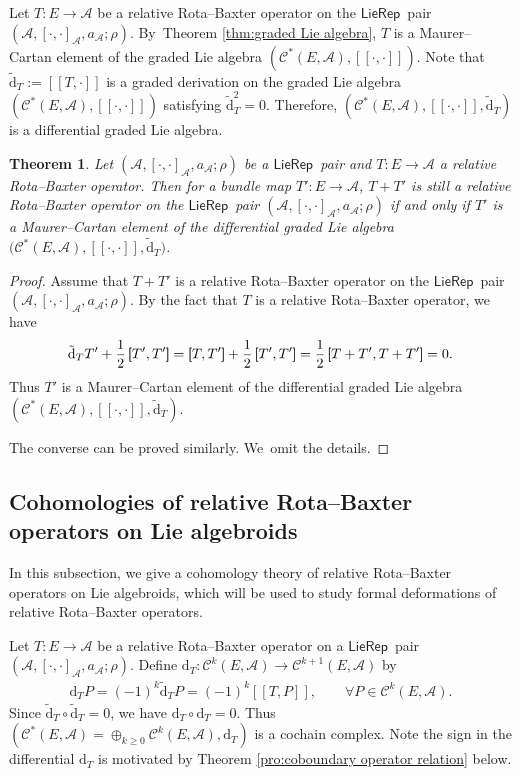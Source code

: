 \documentclass[10pt,a4paper]{amsart}
\numberwithin{equation}{section}
\newtheorem{thm}{Theorem}[section]
\newcommand{\huaA}{\mathcal{A}}
\newcommand{\huaC}{\mathcal{C}}
\newcommand{\Courant}[1]{\left[\!\left[ #1\right]\!\right]}
\newcommand{\Courantt}[1]{\left[\hspace*{-3pt}\left[ #1\right]\hspace*{-3pt}\right]}
\newcommand{\half}{\frac{1}{2}}
\newcommand{\dM}{\mathrm{d}}
\newcommand{\LP}{$\mathsf{LieRep}$~}
\begin{document}
Let $T\colon E\longrightarrow \huaA$ be a relative Rota--Baxter operator on the \LP pair $(\huaA,[\cdot,\cdot]_\huaA,a_\huaA;\rho)$. By~Theorem \ref{thm:graded Lie algebra}, $T$ is a Maurer--Cartan element of the graded Lie algebra $(\huaC^*(E,\huaA),\Courant{\cdot,\cdot})$. Note that $\tilde{\dM}_T:=\Courant{T,\cdot}$ is a graded derivation on the graded Lie algebra $(\huaC^*(E,\huaA),\Courant{\cdot,\cdot})$ satisfying $\tilde{\dM}_T^2=0$. Therefore, $(\huaC^*(E,\huaA),\Courant{\cdot,\cdot},\tilde{\dM}_T)$ is a differential graded Lie algebra.
\begin{thm}
Let $(\huaA,[\cdot,\cdot]_\huaA,a_\huaA;\rho)$ be a \LP pair and $T\colon E\longrightarrow \huaA$ a relative Rota--Baxter operator. Then for a bundle map $T'\colon E\longrightarrow \huaA$, $T+T'$ is still a relative Rota--Baxter operator on the \LP pair $(\huaA,[\cdot,\cdot]_\huaA,a_\huaA;\rho)$ if and only if $T'$ is a Maurer--Cartan element of the differential graded Lie algebra $\big(\huaC^*(E,\huaA),\Courant{\cdot,\cdot},\tilde{\dM}_T\big)$.
\end{thm}

\begin{proof}
{\sloppy	Assume that $T+T'$ is a relative Rota--Baxter operator on the \LP pair $(\huaA,[\cdot,\cdot]_\huaA,a_\huaA;\rho)$. By the fact that $T$ is a relative Rota--Baxter operator, we have
	\begin{gather*}
	\tilde{\dM}_T T'+\half\Courantt{T',T'}=\Courantt{T,T'}+\half\Courantt{T',T'}
	=\half\Courantt{T+T',T+T'}=0.
		\end{gather*}}\noindent
		Thus $T'$ is a Maurer--Cartan element of the differential graded Lie algebra $(\huaC^*(E,\huaA),\Courant{\cdot,\cdot},\tilde{\dM}_T)$.
		
The converse can be proved similarly. We~omit the details.
\end{proof}

\subsection{Cohomologies of relative Rota--Baxter operators on Lie algebroids}
In this subsection, we give a cohomology theory of relative Rota--Baxter operators on Lie algebroids, which will be used to study formal deformations of relative Rota--Baxter operators.

Let $T\colon E\longrightarrow \huaA$ be a relative Rota--Baxter operator on a \LP pair $(\huaA,[\cdot,\cdot]_\huaA,a_\huaA;\rho)$. Define $\dM_{T}\colon \huaC^k(E,\huaA)\rightarrow \huaC^{k+1}(E,\huaA)$ by
\begin{gather*}
\dM_{T}P=(-1)^{k}\tilde{\dM}_T P=(-1)^{k}\Courant{T,P},\qquad \forall P\in \huaC^k(E,\huaA).
\end{gather*}
Since $\tilde{\dM}_T\circ\tilde{\dM}_T=0 $, we have $\dM_{T}\circ \dM_{T}=0$. Thus $(\huaC^*(E,\huaA)=\oplus_{k\geq0}\huaC^k(E,\huaA),\dM_{T})$ is a cochain complex. Note the sign in the differential $\dM_T$ is motivated by Theorem \ref{pro:coboundary operator relation} below.
\end{document}

